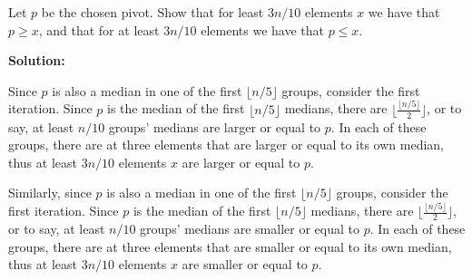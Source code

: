 \documentclass{article}
\begin{document}
Let $p$ be the chosen pivot. Show that for least $3n/10$ elements $x$ we have that $p \geq x$, and
that for at least $3n/10$ elements we have that $p \leq x$.
{\color{blue}
\par\textbf{Solution: }
\par Since $p$ is also a median in one of the first $\lfloor n/5\rfloor$ groups, consider the first iteration. Since $p$
is the median of the first $\lfloor n/5\rfloor$ medians, there are $\lfloor \frac{\lfloor n/5\rfloor}{2}\rfloor$, or to say, at least $n/10$ groups' medians are larger or equal to $p$. In each of these groups, there are at three elements that are larger or equal to its own median, thus at least $3n/10$ elements $x$ are larger or equal to $p$.
\par Similarly, since $p$ is also a median in one of the first $\lfloor n/5\rfloor$ groups, consider the first iteration. Since $p$ is the median of the first $\lfloor n/5\rfloor$ medians, there are $\lfloor \frac{\lfloor n/5\rfloor}{2}\rfloor$, or to say, at least $n/10$ groups' medians are smaller or equal to $p$. In each of these groups, there are at three elements that are smaller or equal to its own median, thus at least $3n/10$ elements $x$ are smaller or equal to $p$.
}
\vspace{0.2in}
\end{document}
